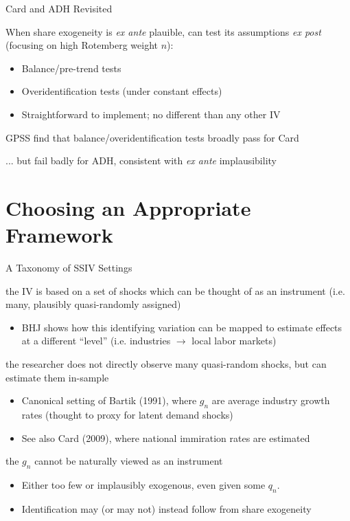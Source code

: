 \documentclass[t]{beamer}
\begin{document}
\begin{frame}{Card and ADH Revisited}

When share exogeneity is \emph{ex ante} plauible, can test its assumptions \emph{ex post} (focusing on high Rotemberg weight $n$):\smallskip

\begin{itemize}
\item Balance/pre-trend tests
\item Overidentification tests (under constant effects)\smallskip
\item Straightforward to implement; no different than any other IV\smallskip
\end{itemize}
\bigskip\pause

GPSS find that balance/overidentification tests broadly pass for Card

 ... but fail badly for ADH, consistent with \emph{ex ante} implausibility
\end{frame}

\section{Choosing an Appropriate Framework}

\begin{frame}{A Taxonomy of SSIV Settings}

\vspace{-4mm}
{\small
{} the IV is based on a set of shocks which can be thought of as an instrument (i.e. many, plausibly quasi-randomly assigned)
\begin{itemize}
  \item BHJ shows how this identifying variation can be mapped to estimate effects at a different ``level'' (i.e. industries $\rightarrow$ local labor markets)
\end{itemize}

\pause
{} the researcher does not directly observe many quasi-random shocks, but can estimate them in-sample
\begin{itemize}
  \item Canonical setting of Bartik (1991), where $g_n$ are average industry growth rates (thought to proxy for latent demand shocks)
  \item See also Card (2009), where national immiration rates are estimated
\end{itemize}

\pause
{} the $g_n$ cannot be naturally viewed as an instrument
\begin{itemize}
  \item Either too few or implausibly exogenous, even given some $q_n$.
  \item Identification may (or may not) instead follow from share exogeneity
\end{itemize}
}



\end{frame}
\end{document}

